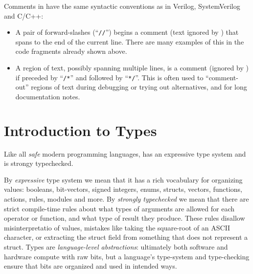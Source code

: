 Comments in {\BSV} have the same syntactic conventions as in Verilog,
SystemVerilog and C/C++:

\begin{itemize}

  \item A pair of forward-slashes (``\verb|//|'') begins a comment
    (text ignored by {\bsc}) that spans to the end of the current
    line.  There are many examples of this in the code fragments
    already shown above.

  \item A region of text, possibly spanning multiple lines, is a
    comment (ignored by {\bsc}) if preceded by ``\verb|/*|'' and
    followed by ``\verb|*/|''.  This is often used to ``comment-out''
    regions of text during debugging or trying out alternatives, and
    for long documentation notes.

\end{itemize}


\section{Introduction to Types}

\label{Sec_Types_Intro}




Like all \emph{safe} modern programming languages, {\BSV} has an
expressive type system and is strongy typechecked.

By \emph{expressive} type system we mean that it has a rich vocabulary
for organizing values: booleans, bit-vectors, signed integers, enums,
structs, vectors, functions, actions, rules, modules and more.  By
\emph{strongly typechecked} we mean that there are strict compile-time
rules about what types of arguments are allowed for each operator or
function, and what type of result they produce.  These rules disallow
misinterpretatio of values, mistakes like taking the square-root of an
ASCII character, or extracting the struct field from something that
does not represent a struct.  Types are \emph{language-level
abstractions}: ultimately both software and hardware compute with raw
bits, but a language's type-system and type-checking ensure that bits
are organized and used in intended ways.

